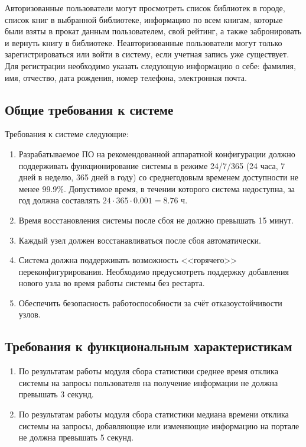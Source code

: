 \documentclass[a4paper, 12pt]{article}
\begin{document}
\begin{large}
Авторизованные пользователи могут просмотреть список библиотек в городе, список книг в выбранной библиотеке, информацию по всем книгам, которые были взяты в прокат данным пользователем, свой рейтинг, а также забронировать и вернуть книгу в библиотеке. 
Неавторизованные пользователи могут только зарегистрироваться или войти в систему, если учетная запись уже существует.
Для регистрации необходимо указать следующую информацию о себе: фамилия, имя, отчество, дата рождения, номер телефона, электронная почта.


\subsection{Общие требования к системе}
Требования к системе следующие:
\begin{enumerate}
	\item Разрабатываемое ПО на рекомендованной аппаратной конфигурации должно поддерживать функционирование системы в режиме 24/7/365 (24 часа, 7 дней в неделю, 365 дней в году) со среднегодовым временем доступности не менее 99.9\%. Допустимое время, в течении которого система недоступна, за год должна составлять $24\cdot365\cdot0.001=8.76$ ч.
	
	\item Время восстановления системы после сбоя не должно превышать 15 минут.
	
	\item Каждый узел должен восстанавливаться после сбоя автоматически.
	
	\item Система должна поддерживать возможность <<горячего>> переконфигурирования. Необходимо предусмотреть поддержку добавления нового узла во время работы системы без рестарта.
	
	\item Обеспечить безопасность работоспособности за счёт отказоустойчивости узлов.
\end{enumerate}

\subsection{Требования к функциональным характеристикам}
\begin{enumerate}
	\item По результатам работы модуля сбора статистики среднее время отклика системы на запросы пользователя на получение информации не должна превышать 3 секунд.
	
	\item По результатам работы модуля сбора статистики медиана времени отклика системы на запросы, добавляющие или изменяющие информацию на портале не должна превышать 5 секунд.
	

\end{enumerate}
\end{large}
\end{document}

